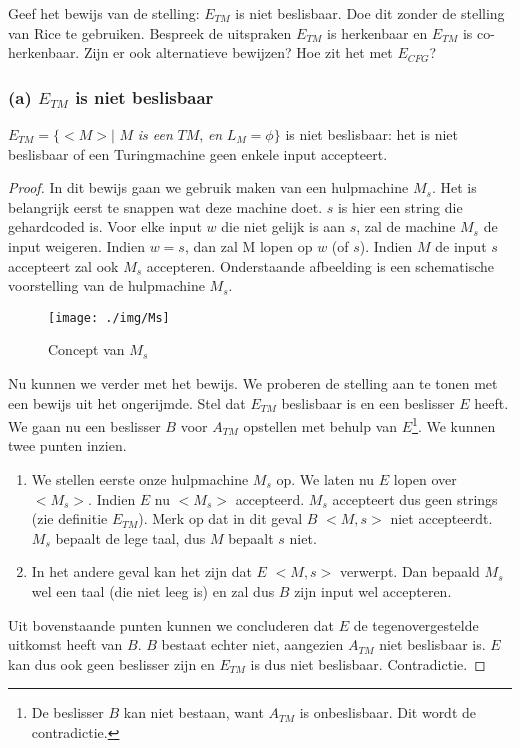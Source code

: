 \begin{question}
	Geef het bewijs van de stelling: $E_{TM}$ is niet beslisbaar. Doe dit zonder de stelling van Rice te gebruiken. Bespreek de uitspraken $E_{TM}$ is herkenbaar en $E_{TM}$ is co-herkenbaar. Zijn er ook alternatieve bewijzen? Hoe zit het met $E_{CFG}$?
\end{question}

\subsubsection{(a) $E_{TM}$ is niet beslisbaar}

\begin{theorem}[$E_{TM}$]
	$E_{TM} = \{<M>|$ $M$ \textit{is een} $TM$, \textit{en} $L_M = \phi \}$ is niet beslisbaar: het is niet beslisbaar of een Turingmachine geen enkele input accepteert.
\end{theorem}

\begin{proof}
	In dit bewijs gaan we gebruik maken van een hulpmachine $M_s$. Het is belangrijk eerst te snappen wat deze machine doet. $s$ is hier een string die gehardcoded is. Voor elke input $w$ die niet gelijk is aan $s$, zal de machine $M_s$ de input weigeren. Indien $w = s$, dan zal M lopen op $w$ (of $s$). Indien $M$ de input $s$ accepteert zal ook $M_s$ accepteren. Onderstaande afbeelding is een schematische voorstelling van de hulpmachine $M_s$.
	\begin{figure}[H]
  	\centering
    	  \texttt{[image: ./img/Ms]}
  	\caption{Concept van $M_s$}
	\end{figure}
	Nu kunnen we verder met het bewijs. We proberen de stelling aan te tonen met een bewijs uit het ongerijmde. Stel dat $E_{TM}$ beslisbaar is en een beslisser $E$ heeft. We gaan nu een beslisser $B$ voor $A_{TM}$ opstellen met behulp van $E$\footnote{De beslisser $B$ kan niet bestaan, want $A_{TM}$ is onbeslisbaar. Dit wordt de contradictie.}. We kunnen twee punten inzien.
	\begin{enumerate}
		\item We stellen eerste onze hulpmachine $M_s$ op. We laten nu $E$ lopen over $<M_s>$. Indien $E$ nu $<M_s>$ accepteerd. $M_s$ accepteert dus geen strings (zie definitie $E_{TM}$). Merk op dat in dit geval $B$ $<M,s>$ niet accepteerdt. $M_s$ bepaalt de lege taal, dus $M$ bepaalt $s$ niet.
		\item In het andere geval kan het zijn dat $E$ $<M,s>$ verwerpt. Dan bepaald $M_s$ wel een taal (die niet leeg is) en zal dus $B$ zijn input wel accepteren.
	\end{enumerate}
	Uit bovenstaande punten kunnen we concluderen dat $E$ de tegenovergestelde uitkomst heeft van $B$. $B$ bestaat echter niet, aangezien $A_{TM}$ niet beslisbaar is. $E$ kan dus ook geen beslisser zijn en $E_{TM}$ is dus niet beslisbaar. Contradictie.
\end{proof}

